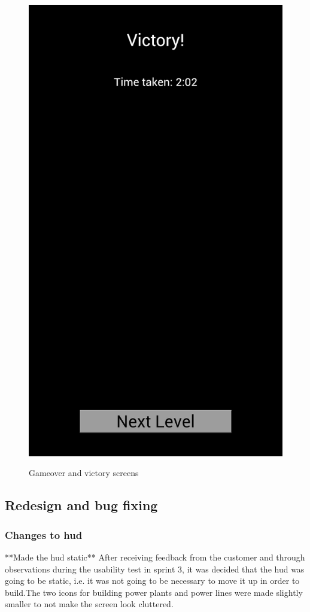 \begin{figure}[H]
{		\includegraphics[scale=0.18]{pictures/sprint4-screen/victory}
	}
	\caption{Gameover and victory screens}
\end{figure}
\subsection{Redesign and bug fixing}
	
	\subsubsection*{Changes to hud}
		**Made the hud static**
		After receiving feedback from the customer and through observations during the usability test in sprint 3, it was decided that the hud was going to be static, i.e. it was not going to be necessary to move it up in order to build.The two icons for building power plants and power lines were made slightly smaller to not make the screen look cluttered.
